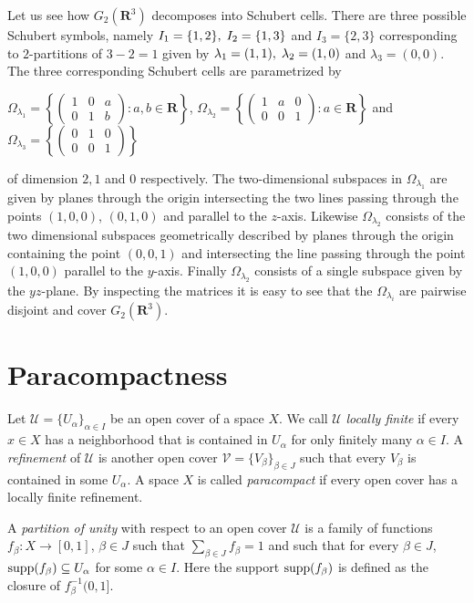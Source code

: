 \documentclass[a4paper,openany]{scrbook}
\begin{document}
\begin{example}
Let us see how $G_2(\mathbf{R}^3)$ decomposes into Schubert cells. There are three possible Schubert symbols, namely $I_1 = \{ 1,2 \}, \thickspace I_2 = \{ 1,3 \}$ and $I_3 = \{ 2,3 \}$ corresponding to $2$-partitions of $3-2 = 1$ given by $\lambda_1 = (1,1), \thickspace \lambda_2 = (1,0)$ and $\lambda_3 = (0,0)$. 
The three corresponding Schubert cells are parametrized by
\begin{center}
$\displaystyle \Omega_{\lambda_1} = \left \{  \begin{pmatrix} 1 & 0 & a \\ 0 & 1 & b \end{pmatrix} : a,b \in \mathbf{R} \right \}$, $\displaystyle \Omega_{\lambda_2} = \left \{  \begin{pmatrix} 1 & a & 0 \\ 0 & 0 & 1 \end{pmatrix} : a \in \mathbf{R} \right \}$ and $\displaystyle \Omega_{\lambda_3} = \left \{  \begin{pmatrix} 0 & 1 & 0 \\ 0 & 0 & 1 \end{pmatrix} \right \}$
\end{center} \noindent
of dimension $2,1$ and $0$ respectively. The two-dimensional subspaces in $\Omega_{\lambda_1}$ are given by planes  through the origin intersecting the two lines passing through the points $(1,0,0)$, $(0,1,0)$ and parallel to the $z$-axis. Likewise $\Omega_{\lambda_2}$ consists of the two dimensional subspaces geometrically described by planes through the origin containing the point $(0,0,1)$ and intersecting the line passing through the point $(1,0,0)$ parallel to the $y$-axis. Finally $\Omega_{\lambda_2}$ consists of a single subspace given by the $yz$-plane. By inspecting the matrices it is easy to see that the $\Omega_{\lambda_i}$ are pairwise disjoint and cover $G_2(\mathbf{R}^3)$.
\end{example}

\section{Paracompactness}\label{sec:paracompactness}

\begin{defn}
Let $\mathcal U = \{U_\alpha\}_{\alpha \in I}$ be an open cover of a space $X$. We call $\mathcal U$ \emph{locally finite} if every $x \in X$ has a neighborhood that is contained in $U_\alpha$ for only finitely many $\alpha \in I$. A \emph{refinement} of $\mathcal U$ is another open cover $\mathcal V = \{V_\beta\}_{\beta \in J}$ such that every $V_\beta$ is contained in some $U_\alpha$. A space $X$ is called \emph{paracompact} if every open cover has a locally finite refinement.

A \emph{partition of unity} with respect to an open cover $\mathcal U$ is a family of functions $f_\beta\colon X \to [0,1]$, $\beta \in J$ such that $\sum_{\beta \in J} f_{\beta} = 1$ and such that for every $\beta \in J$, $\operatorname{supp}(f_\beta) \subseteq U_\alpha$ for some $\alpha \in I$. Here the support $\operatorname{supp}(f_\beta)$ is defined as the closure of $f_\beta^{-1}(0,1]$.
\end{defn}
\end{document}
